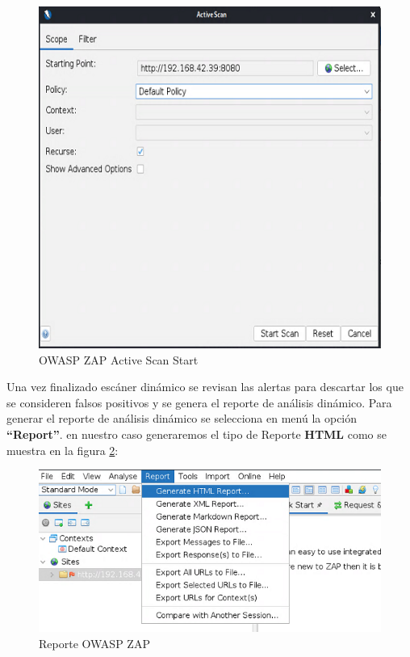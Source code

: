 \begin{figure}[!htb]
    \centering
    \captionsetup{width=1\linewidth}   
    \includegraphics[scale=0.9]{./imagenes/03_03_WebGoat_ZapProxyActiveScanStart.png}
    \caption{OWASP ZAP Active Scan Start}  
    \label{fig:OWASPZap Active Scan Start}
\end{figure}

\newpage
Una vez finalizado escáner dinámico se revisan las alertas para descartar los que se consideren falsos positivos y 
se genera el reporte de análisis dinámico. Para generar el reporte de análisis dinámico 
se selecciona en menú la opción \textbf{“Report”}. en nuestro caso generaremos el tipo de Reporte \textbf{HTML} 
como se muestra en la figura \ref{fig:OWASPZapReport}: 

\begin{figure}[!htb]
    \centering
    \captionsetup{width=1\linewidth}   
    \includegraphics[scale=0.7]{./imagenes/03_04_OWASP_ZAP_Report.png}
    \caption{Reporte OWASP ZAP}  
    \label{fig:OWASPZapReport}
\end{figure}

